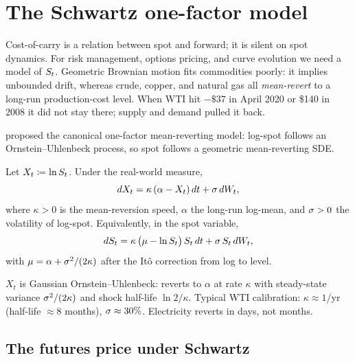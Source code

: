\section{The Schwartz one-factor model}
\label{sec:schwartz_model}

Cost-of-carry is a relation between spot and forward; it is silent
on spot dynamics.  For risk management, options pricing, and curve
evolution we need a model of $S_t$.  Geometric Brownian motion
fits commodities poorly: it implies unbounded drift, whereas crude,
copper, and natural gas all \emph{mean-revert} to a long-run
production-cost level.  When WTI hit $-\$37$ in April 2020 or \$140
in 2008 it did not stay there; supply and demand pulled it back.

\citet{schwartz1997stochastic} proposed the canonical one-factor
mean-reverting model: log-spot follows an Ornstein--Uhlenbeck
process, so spot follows a geometric mean-reverting SDE.

\begin{definition}
Let $X_t \coloneqq \ln S_t$.  Under the real-world measure,
\begin{equation}
  dX_t = \kappa\,(\alpha - X_t)\,dt + \sigma\,dW_t,
  \label{eq:schwartz_ou_log}
\end{equation}
where $\kappa > 0$ is the mean-reversion speed, $\alpha$ the
long-run log-mean, and $\sigma > 0$ the volatility of log-spot.
Equivalently, in the spot variable,
\begin{equation}
  dS_t = \kappa\,\bigl(\mu - \ln S_t\bigr)\,S_t\,dt
          + \sigma\,S_t\,dW_t,
  \label{eq:schwartz_spot}
\end{equation}
with $\mu = \alpha + \sigma^2/(2\kappa)$ after the Itô correction
from log to level.
\end{definition}

$X_t$ is Gaussian Ornstein--Uhlenbeck: reverts to $\alpha$ at rate
$\kappa$ with steady-state variance $\sigma^2/(2\kappa)$ and shock
half-life $\ln 2 / \kappa$.  Typical WTI calibration: $\kappa
\approx 1$/yr (half-life $\approx 8$ months), $\sigma \approx 30\%$.
Electricity reverts in days, not months.

\subsection{The futures price under Schwartz}

